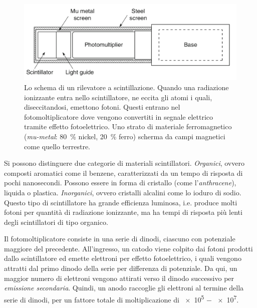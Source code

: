 \documentclass[../main.tex]{subfiles}
\begin{document}
\begin{figure}[!b]
    \centering
    \includegraphics[width=\textwidth]{pmt_trasp.png}
    \caption{Lo schema di un rilevatore a scintillazione. Quando una radiazione ionizzante entra nello scintillatore, ne eccita gli atomi i quali, diseccitandosi, emettono fotoni. Questi entrano nel fotomoltiplicatore dove vengono convertiti in segnale elettrico tramite effetto fotoelettrico. Uno strato di materiale ferromagnetico (\emph{mu-metal}: \SI{80}{\%} nickel, \SI{20}{\%} ferro) scherma da campi magnetici come quello terrestre.
    \cite{spurio}}
    \label{fig:pmt}
\end{figure}

Si possono distinguere due categorie di materiali scintillatori.
\emph{Organici}, ovvero composti aromatici come il benzene, caratterizzati da un tempo di risposta di pochi nanosecondi. Possono essere in forma di cristallo (come l'\emph{anthracene}), liquida o plastica. \emph{Inorganici}, ovvero cristalli alcalini come lo ioduro di sodio. Questo tipo di scintillatore ha grande efficienza luminosa, i.e. produce molti fotoni per quantità di radiazione ionizzante, ma ha tempi di risposta più lenti degli scintillatori di tipo organico.

Il fotomoltiplicatore consiste in una serie di dinodi, ciascuno con potenziale maggiore del precedente. All'ingresso, un catodo viene colpito dai fotoni prodotti dallo scintillatore ed emette elettroni per effetto fotoelettrico, i quali vengono attratti dal primo dinodo della serie per differenza di potenziale. Da qui, un maggior numero di elettroni vengono attirati verso il dinodo successivo per \emph{emissione secondaria}. Quindi, un anodo raccoglie gli elettroni al termine della serie di dinodi, per un fattore totale di moltiplicazione di \SI{e5}{} $-$ \SI{e7}{}.
\end{document}
